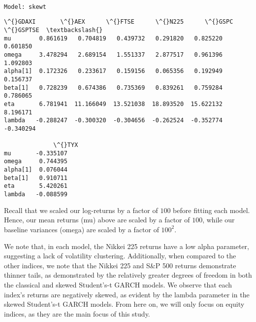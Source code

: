 \documentclass[11pt]{article}
\begin{document}
    
    \begin{Verbatim}[commandchars=\\\{\}]

Model: skewt
    \end{Verbatim}

    
    \begin{Verbatim}[commandchars=\\\{\}]
            \^{}GDAXI       \^{}AEX      \^{}FTSE      \^{}N225      \^{}GSPC   \^{}GSPTSE  \textbackslash{}
mu        0.861619   0.704819   0.439732   0.291820   0.825220  0.601850   
omega     3.478294   2.689154   1.551337   2.877517   0.961396  1.092803   
alpha[1]  0.172326   0.233617   0.159156   0.065356   0.192949  0.156737   
beta[1]   0.728239   0.674386   0.735369   0.839261   0.759284  0.786065   
eta       6.781941  11.166049  13.521038  18.893520  15.622132  8.196171   
lambda   -0.288247  -0.300320  -0.304656  -0.262524  -0.352774 -0.340294   

              \^{}TYX  
mu       -0.335107  
omega     0.744395  
alpha[1]  0.076044  
beta[1]   0.910711  
eta       5.420261  
lambda   -0.088599  
    \end{Verbatim}

    
    Recall that we scaled our log-returns by a factor of \(100\) before
fitting each model. Hence, our mean returns (mu) above are scaled by a
factor of \(100\), while our baseline variances (omega) are scaled by a
factor of \(100^2\).

We note that, in each model, the Nikkei 225 returns have a low alpha
parameter, suggesting a lack of volatility clustering. Additionally,
when compared to the other indices, we note that the Nikkei 225 and S\&P
500 returns demonstrate thinner tails, as demonstrated by the relatively
greater degrees of freedom in both the classical and skewed Student's-t
GARCH models. We observe that each index's returns are negatively
skewed, as evident by the lambda parameter in the skewed Student's-t
GARCH models. From here on, we will only focus on equity indices, as
they are the main focus of this study.
\end{document}
